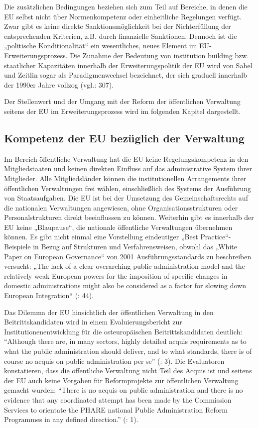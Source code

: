 Die zusätzlichen Bedingungen beziehen sich zum Teil auf Bereiche, in denen die EU selbst nicht über Normenkompetenz oder einheitliche Regelungen verfügt. Zwar gibt es keine direkte Sanktionsmöglichkeit bei der Nichterfüllung der entsprechenden Kriterien, z.B. durch finanzielle Sanktionen. Dennoch ist die „politische Konditionalität“ ein wesentliches, neues Element im EU-Erweiterungsprozess. Die Zunahme der Bedeutung von institution building bzw. staatlicher Kapazitäten innerhalb der Erweiterungspolitik der EU wird von Sabel und Zeitlin sogar als Paradigmenwechsel bezeichnet, der sich graduell innerhalb der 1990er Jahre vollzog (vgl.\cite{sabzei}: 307).\par
Der Stellenwert und der Umgang mit der Reform der öffentlichen Verwaltung seitens der EU im Erweiterungsprozess wird im folgenden Kapitel dargestellt.

\subsection{Kompetenz der EU bezüglich der Verwaltung}
Im Bereich öffentliche Verwaltung hat die EU keine Regelungskompetenz in den Mitgliedstaaten und keinen direkten Einfluss auf das administrative System ihrer Mitglieder. Alle Mitgliedsländer können die institutionellen Arrangements ihrer öffentlichen Verwaltungen frei wählen, einschließlich des Systems der Ausführung von Staatsaufgaben. Die EU ist bei der Umsetzung des Gemeinschaftsrechts auf die nationalen Verwaltungen angewiesen, ohne Organisationsstrukturen oder Personalstrukturen direkt beeinflussen zu können. Weiterhin gibt es innerhalb der EU keine „Blaupause“, die nationale öffentliche Verwaltungen übernehmen können. Es gibt nicht einmal eine Vorstellung eindeutiger „Best Practice“-Beispiele in Bezug auf Strukturen und Verfahrensweisen, obwohl das „White Paper on European Governance“ von 2001 Ausführungsstandards zu beschreiben versucht: „The lack of a clear overarching public administration model and the relatively weak European powers for the imposition of specific changes in domestic administrations might also be considered as a factor for slowing down European Integration“ (\cite{sverdrup}: 44).\par

Das Dilemma der EU hinsichtlich der öffentlichen Verwaltung in den Beitrittskandidaten wird in einem Evaluierungsbericht zur Institutionenentwicklung für die osteuropäischen Beitrittskandidaten deutlich: “Although there are, in many sectors, highly detailed acquis requirements as to what the public administration should deliver, and to what standards, there is of course no acquis on public administration per se” (\cite{omas}: 3). Die Evaluatoren konstatieren, dass die öffentliche Verwaltung nicht Teil des Acquis ist und seitens der EU auch keine Vorgaben für Reformprojekte zur öffentlichen Verwaltung gemacht wurden: “There is no acquis on public administration and there is no evidence that any coordinated attempt has been made by the Commission Services to orientate the PHARE national Public Administration Reform Programmes in any defined direction.” (\cite{omas}: 1). \par

